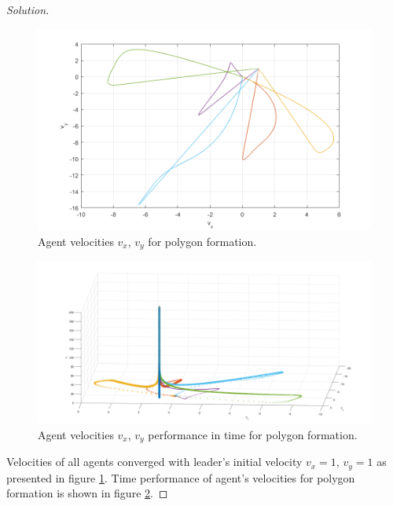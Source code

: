 \documentclass[12pt]{article}
\newenvironment{solution}{\begin{proof}[Solution]}{\end{proof}}
\begin{document}
\begin{solution}
\begin{figure}[!h]
	\includegraphics[scale=0.41]{figures/PolygonVelocities2D.png}
	\centering
	\caption{Agent velocities $v_x$, $v_y$ for polygon formation.}
	\label{polygonVel}
\end{figure}
\begin{figure}[!t]
	\includegraphics[scale=0.34]{figures/PolygonVelocities3D.png}
	\centering
	\caption{Agent velocities $v_x$, $v_y$ performance in time for polygon formation.}
	\label{polygonVel_3D}
\end{figure} 
Velocities of all agents converged with leader's initial velocity $v_x=1$, $v_y=1$ as presented in figure \ref{polygonVel}. Time performance of agent's velocities for polygon formation is shown in figure \ref{polygonVel_3D}.


\end{solution}
\end{document}
